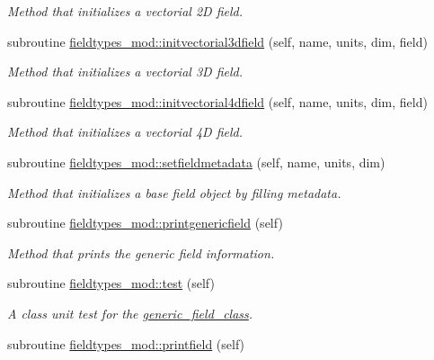 \begin{DoxyCompactItemize}
\begin{DoxyCompactList}\small\item\em Method that initializes a vectorial 2D field. \end{DoxyCompactList}\item 
subroutine \mbox{\hyperlink{namespacefieldtypes__mod_a20d935cfa1513350667d04f969be5e26}{fieldtypes\+\_\+mod\+::initvectorial3dfield}} (self, name, units, dim, field)
\begin{DoxyCompactList}\small\item\em Method that initializes a vectorial 3D field. \end{DoxyCompactList}\item 
subroutine \mbox{\hyperlink{namespacefieldtypes__mod_ad458710e4a2d6c40a3dfa7f19481cd5a}{fieldtypes\+\_\+mod\+::initvectorial4dfield}} (self, name, units, dim, field)
\begin{DoxyCompactList}\small\item\em Method that initializes a vectorial 4D field. \end{DoxyCompactList}\item 
subroutine \mbox{\hyperlink{namespacefieldtypes__mod_abc601ce9f8a974f426e876cc4c02e2a2}{fieldtypes\+\_\+mod\+::setfieldmetadata}} (self, name, units, dim)
\begin{DoxyCompactList}\small\item\em Method that initializes a base field object by filling metadata. \end{DoxyCompactList}\item 
subroutine \mbox{\hyperlink{namespacefieldtypes__mod_a63d399d72fffde3fe8169b76cce59259}{fieldtypes\+\_\+mod\+::printgenericfield}} (self)
\begin{DoxyCompactList}\small\item\em Method that prints the generic field information. \end{DoxyCompactList}\item 
subroutine \mbox{\hyperlink{namespacefieldtypes__mod_a0babd6327ed77199d5437d17de34bafe}{fieldtypes\+\_\+mod\+::test}} (self)
\begin{DoxyCompactList}\small\item\em A class \textquotesingle{}unit\textquotesingle{} test for the \mbox{\hyperlink{structfieldtypes__mod_1_1generic__field__class}{generic\+\_\+field\+\_\+class}}. \end{DoxyCompactList}\item 
subroutine \mbox{\hyperlink{namespacefieldtypes__mod_a5a556fba603c1d39b20713fdbc813332}{fieldtypes\+\_\+mod\+::printfield}} (self)

\end{DoxyCompactItemize}
